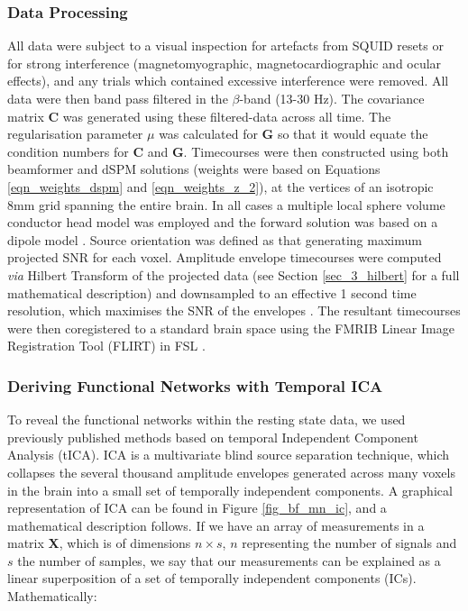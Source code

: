 \subsubsection{Data Processing}
All data were subject to a visual inspection for artefacts from SQUID resets or for strong interference (magnetomyographic, magnetocardiographic and ocular effects), and any trials which contained excessive interference were removed. All data were then band pass filtered in the $\beta$-band (13-30 Hz). The covariance matrix $\mathbf{C}$ was generated using these filtered-data across all time. The regularisation parameter $\mu$ was calculated for $\mathbf{G}$ so that it would equate the condition numbers for $\mathbf{C}$ and $\mathbf{G}$. Timecourses were then constructed using both beamformer and dSPM solutions (weights were based on Equations \ref{eqn_weights_dspm} and \ref{eqn_weights_z_2}), at the vertices of an isotropic 8mm grid spanning the entire brain. In all cases a multiple local sphere volume conductor head model \citep{Huang1999} was employed and the forward solution was based on a dipole model \citep{Sarvas1987}. Source orientation was defined as that generating maximum projected SNR for each voxel. Amplitude envelope timecourses were computed \textit{via} Hilbert Transform of the projected data (see Section \ref{sec_3_hilbert} for a full mathematical description) and downsampled to an effective 1 second time resolution, which maximises the SNR of the envelopes \citep{Luckhoo2012}. The resultant timecourses were then coregistered to a standard brain space using the FMRIB Linear Image Registration Tool (FLIRT) in FSL \citep{Jenkinson2012}.   

\subsubsection{Deriving Functional Networks with Temporal ICA} To reveal the functional networks within the resting state data, we used previously published methods \citep{Brookes2011,Luckhoo2012,Hall2013} based on temporal Independent Component Analysis (tICA). ICA is a multivariate blind source separation technique, which collapses the several thousand amplitude envelopes generated across many voxels in the brain into a small set of temporally independent components. A graphical representation of ICA can be found in Figure \ref{fig_bf_mn_ic}, and a mathematical description follows. If we have an array  of measurements in a matrix \textbf{X}, which is of dimensions $n\times s$, $n$ representing the number of signals and $s$ the number of samples, we say that our measurements can be explained as a linear superposition of a set of temporally independent components (ICs). Mathematically:

